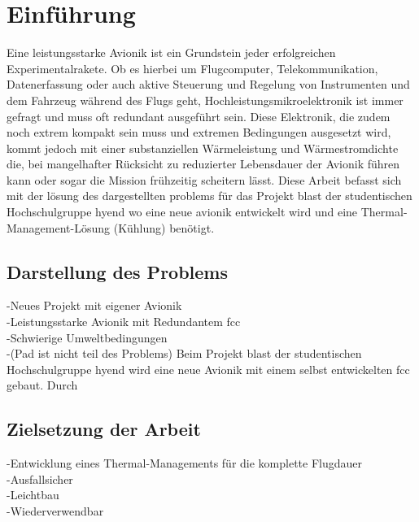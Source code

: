 \chapter{Einführung}			
\label{sec:Introduction}


Eine leistungsstarke Avionik ist ein Grundstein jeder erfolgreichen Experimentalrakete.
Ob es hierbei um Flugcomputer, Telekommunikation, Datenerfassung oder auch aktive Steuerung und Regelung von
Instrumenten und dem Fahrzeug während des Flugs geht, Hochleistungsmikroelektronik ist immer gefragt und muss oft redundant ausgeführt sein.
Diese Elektronik, die zudem noch extrem kompakt sein muss und extremen Bedingungen ausgesetzt wird, kommt jedoch mit einer
substanziellen Wärmeleistung und Wärmestromdichte die, bei mangelhafter Rücksicht zu reduzierter Lebensdauer der Avionik führen
kann oder sogar die Mission frühzeitig scheitern lässt.
Diese Arbeit befasst sich mit der lösung des dargestellten problems für das Projekt \ac{blast} der studentischen Hochschulgruppe \ac{hyend}
wo eine neue avionik entwickelt wird und eine Thermal-Management-Lösung (Kühlung) benötigt.\\

\section{Darstellung des Problems}

-Neues Projekt mit eigener Avionik\\
-Leistungsstarke Avionik mit Redundantem \ac{fcc}\\
-Schwierige Umweltbedingungen\\
-(Pad ist nicht teil des Problems)
\newline
Beim Projekt \ac{blast} der studentischen Hochschulgruppe \ac{hyend} wird eine neue Avionik mit einem selbst entwickelten \ac{fcc} gebaut. Durch 

\section{Zielsetzung der Arbeit}

-Entwicklung eines Thermal-Managements für die komplette Flugdauer\\
-Ausfallsicher\\
-Leichtbau\\
-Wiederverwendbar

